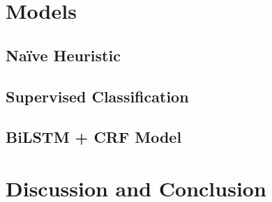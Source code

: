 \section{Models}

\subsection{Na\"ive Heuristic}

\subsection{Supervised Classification}

\subsection{BiLSTM + CRF Model }


\section{Discussion and Conclusion}
